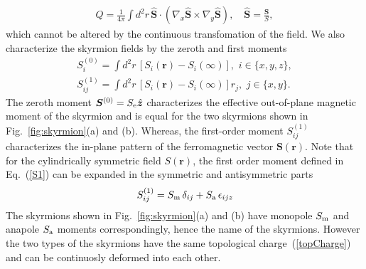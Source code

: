 \documentclass[twocolumn,showpacs,floatfix,nofootinbib,longbibliography]{revtex4-1}
\begin{document}
\begin{align}
	Q = \frac{1}{4\pi} \int d^2r \, \hat {\bm S}\cdot (\nabla_x\hat {\bm S}\times\nabla_y\hat {\bm S}), \quad \hat {\bm S}= \frac{\bm S}{S}, 
	\label{topCharge}
\end{align}
which cannot be altered by the continuous transfomation of the field.  We also characterize the skyrmion fields by the zeroth and first moments
\begin{align}
	S^{(0)}_i = \int  d^2r \, \left[S_i(\bm r)-S_i(\infty)\right],\,\, i\in \{x,y,z\}, \label{S0} \\
	S^{(1)}_{ij} = \int  d^2r \, \left[S_i(\bm r)-S_i(\infty)\right] r_j,\,\, j\in \{x,y\}. \label{S1}
\end{align}
The zeroth moment $\bm S^{(0)} = S_{\rm e} \hat{\bm z}$ characterizes the effective out-of-plane magnetic moment of the skyrmion and is equal for the two skyrmions shown in Fig.~{\ref{fig:skyrmion}}(a) and (b). Whereas, the first-order moment $S^{(1)}_{ij}$ characterizes the in-plane pattern of the ferromagnetic vector $\bm S(\bm r)$. Note that for the cylindrically symmetric field $S(\bm r)$, the first order moment defined in Eq.~(\ref{S1}) can be expanded in the symmetric and antisymmetric parts 
\begin{equation}
	S^{(1)}_{ij}=S_{\rm m}\,\delta_{ij} + S_{\rm a}\,\epsilon_{ijz}
\end{equation}	
The skyrmions shown in Fig.~\ref{fig:skyrmion}(a) and (b) have monopole $S_{\rm m}$ and anapole $S_{\rm a}$ moments correspondingly, hence the name of the skyrmions. However the two types of the skyrmions have the same topological charge~(\ref{topCharge}) and can be continuosly deformed into each other. 
\end{document}
